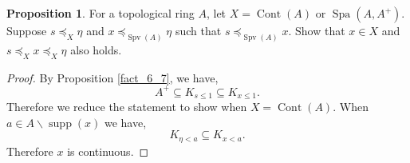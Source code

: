 \documentclass[10pt]{article}
\numberwithin{equation}{section}
\theoremstyle{definition}
\newtheorem{proposition}{Proposition}[subsection]
\DeclareMathOperator{\supp}{supp}
\DeclareMathOperator{\Spa}{Spa}
\DeclareMathOperator{\Spv}{Spv}
\DeclareMathOperator{\Cont}{Cont}
\begin{document}
\begin{proposition}
    \label{fact_15_12}
    For a topological ring $A$, let $X = \Cont(A)$ or $\Spa(A,A^+)$. Suppose $s\preceq_X \eta$ and $x\preceq_{\Spv(A)}\eta$ such that $s\preceq_{\Spv(A)}x$.
    Show that $x\in X$ and $s\preceq_X x\preceq_X \eta$ also holds.
\end{proposition}

\begin{proof}
    By Proposition \ref{fact_6_7}, we have,
    \begin{equation*}
    A^+\subseteq K_{s\leq 1}\subseteq K_{x\leq 1}.
    \end{equation*}
    Therefore we reduce the statement to show when $X=\Cont(A)$. When $a\in A\backslash \supp(x) $ we have,
    \begin{equation*}
    K_{\eta<a}\subseteq K_{x<a}.
    \end{equation*}
    Therefore $x$ is continuous.
\end{proof}
\end{document}
